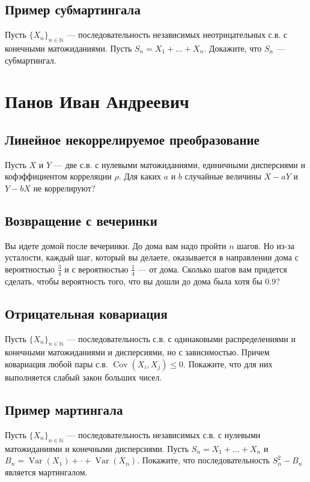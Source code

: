 \documentclass[12pt]{article}
\newcommand\N{\mathbb{N}}
\DeclareMathOperator{\Var}{Var}
\DeclareMathOperator{\Cov}{Cov}
\begin{document}
\subsection{Пример субмартингала}

Пусть $\{X_n\}_{n \in \N}$ --- последовательность независимых неотрицательных с.в. с конечными матожиданиями. Пусть $S_n = X_1 + \dots + X_n$. Докажите, что $S_n$ --- субмартингал.

\newpage
\section{Панов Иван Андреевич}

\subsection{Линейное некоррелируемое преобразование}

Пусть $X$ и $Y$ --- две с.в. с нулевыми матожиданиями, единичными дисперсиями и кофэффициентом корреляции $\rho$. Для каких $a$ и $b$ случайные величины $X - aY$ и $Y - bX$ не коррелируют?


\subsection{Возвращение с вечеринки}

Вы идете домой после вечеринки. До дома вам надо пройти $n$ шагов. Но из-за усталости, каждый шаг, который вы делаете, оказывается в направлении дома с вероятностью $\frac{3}{4}$ и с вероятностью $\frac{1}{4}$ --- от дома. Сколько шагов вам придется сделать, чтобы вероятность того, что вы дошли до дома была хотя бы $0.9$?

\subsection{Отрицательная ковариация}

Пусть $\{X_n\}_{n \in \N}$ --- последовательность с.в. с одинаковыми распределениями и конечными матожиданиями и дисперсиями, но с зависимостью. Причем ковариация любой пары с.в. $\Cov(X_i, X_j) \le 0$. Покажите, что для них выполняется слабый закон больших чисел.


\subsection{Пример мартингала}

Пусть $\{X_n\}_{n \in \N}$ --- последовательность независимых с.в. с нулевыми матожиданиями и конечными дисперсиями. Пусть $S_n = X_1 + \dots + X_n$ и $B_n = \Var(X_1) + \cdot + \Var(X_n)$. Покажите, что последовательность $S_n^2 - B_n$ является мартингалом.
\end{document}
